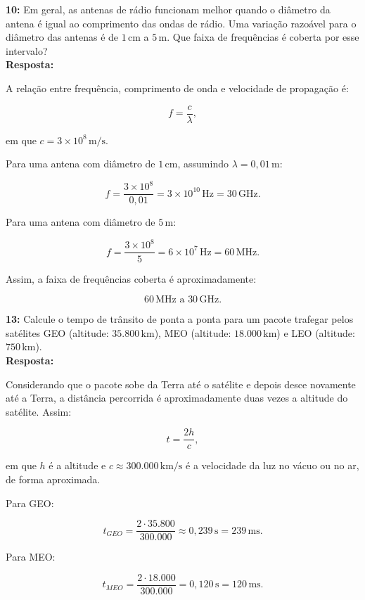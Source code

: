 \documentclass[12pt,a4paper]{report}
\begin{document}
\vspace{0.6cm}

\noindent \textbf{10:} Em geral, as antenas de rádio funcionam melhor quando o diâmetro da antena é igual ao comprimento das ondas de rádio. Uma variação razoável para o diâmetro das antenas é de $1\,\text{cm}$ a $5\,\text{m}$. Que faixa de frequências é coberta por esse intervalo?\\
\textbf{Resposta:}

A relação entre frequência, comprimento de onda e velocidade de propagação é:

\[
f = \frac{c}{\lambda},
\]

em que $c = 3 \times 10^8\,\text{m/s}$.

Para uma antena com diâmetro de $1\,\text{cm}$, assumindo $\lambda = 0{,}01\,\text{m}$:

\[
f = \frac{3 \times 10^8}{0{,}01} = 3 \times 10^{10}\,\text{Hz} = 30\,\text{GHz}.
\]

Para uma antena com diâmetro de $5\,\text{m}$:

\[
f = \frac{3 \times 10^8}{5} = 6 \times 10^7\,\text{Hz} = 60\,\text{MHz}.
\]

Assim, a faixa de frequências coberta é aproximadamente:

\[
\boxed{60\,\text{MHz} \text{ a } 30\,\text{GHz}}.
\]


\vspace{0.6cm}

\noindent \textbf{13:} Calcule o tempo de trânsito de ponta a ponta para um pacote trafegar pelos satélites GEO (altitude: $35.800\,\text{km}$), MEO (altitude: $18.000\,\text{km}$) e LEO (altitude: $750\,\text{km}$).\\
\textbf{Resposta:}

Considerando que o pacote sobe da Terra até o satélite e depois desce novamente até a Terra, a distância percorrida é aproximadamente duas vezes a altitude do satélite. Assim:

\[
t = \frac{2h}{c},
\]

em que $h$ é a altitude e $c \approx 300.000\,\text{km/s}$ é a velocidade da luz no vácuo ou no ar, de forma aproximada.

Para GEO:

\[
t_{GEO} = \frac{2 \cdot 35.800}{300.000} \approx 0{,}239\,\text{s} = 239\,\text{ms}.
\]

Para MEO:

\[
t_{MEO} = \frac{2 \cdot 18.000}{300.000} = 0{,}120\,\text{s} = 120\,\text{ms}.
\]
\end{document}
